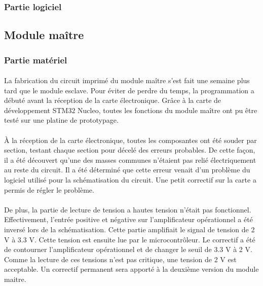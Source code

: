 		\subsubsection{Partie logiciel}
			
			\paragraph{}


	
	\subsection{Module maître}
	
		\subsubsection{Partie matériel}	
		
			\paragraph{}	
			La fabrication du circuit imprimé du module maître s’est fait une semaine plus tard que le module esclave. Pour éviter de perdre du temps, la programmation a débuté avant la réception de la carte électronique. Grâce à la carte de développement STM32 Nucleo, toutes les fonctions du module maître ont pu être testé sur une platine de prototypage.
			
			\paragraph{}
			À la réception de la carte électronique, toutes les composantes ont été souder par section, testant chaque section pour décelé des erreurs probables. De cette façon, il a été découvert qu’une des masses communes n’étaient pas relié électriquement au reste du circuit. Il a été déterminé que cette erreur venait d’un problème du logiciel utilisé pour la schématisation du circuit. Une petit correctif sur la carte a permis de régler le problème.
			
			
			\paragraph{}
			De plus, la partie de lecture de tension a hautes tension n’était pas fonctionnel. Effectivement, l’entrée positive et négative sur l'amplificateur opérationnel a été inversé lors de la schématisation. Cette partie amplifiait le signal de tension de 2 V à 3.3 V. Cette tension est ensuite lue par le microcontrôleur. Le correctif a été de contourner l’amplificateur opérationnel et de changer le seuil de 3.3 V à 2 V. Comme la lecture de ces tensions n’est pas critique, une tension de 2 V est acceptable. Un correctif permanent sera apporté à la deuxième version du module maitre.
		
